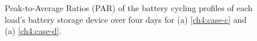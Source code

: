 \begin{figure}\centering
	\caption{Peak-to-Average Ratios (PAR) of the battery cycling profiles of each load's battery storage device over four days for (a) \ref{ch4:case-c}  and  (a) \ref{ch4:case-d}.}
	\label{ch4:fig:storage-aimd-par}
\end{figure}
